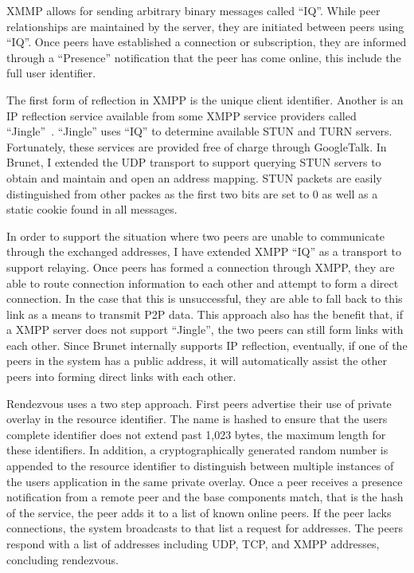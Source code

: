XMMP allows for sending arbitrary binary messages called ``IQ''.  While peer
relationships are maintained by the server, they are initiated between peers
using ``IQ''.  Once peers have established a connection or subscription, they
are informed through a ``Presence'' notification that the peer has come online,
this include the full user identifier.

The first form of reflection in XMPP is the unique client identifier.
Another is an IP reflection service available from some XMPP service providers
called ``Jingle''~\cite{jingle}.  ``Jingle'' uses ``IQ'' to determine available
STUN and TURN servers.  Fortunately, these services are provided free of charge
through GoogleTalk.  In Brunet, I extended the UDP transport to support
querying STUN servers to obtain and maintain and open an address mapping.  STUN
packets are easily distinguished from other packes as the first two bits are
set to 0 as well as a static cookie found in all messages.

In order to support the situation where two peers are unable to communicate
through the exchanged addresses, I have extended XMPP ``IQ'' as a transport to
support relaying.  Once peers has formed a connection through XMPP,
they are able to route connection information to each other and attempt to form
a direct connection.  In the case that this is unsuccessful, they are able to
fall back to this link as a means to transmit P2P data.  This approach also has
the benefit that, if a XMPP server does not support ``Jingle'', the two peers
can still form links with each other.  Since Brunet internally supports IP
reflection, eventually, if one of the peers in the system has a public address,
it will automatically assist the other peers into forming direct links with
each other.

Rendezvous uses a two step approach.  First peers advertise their use
of private overlay in the resource identifier.  The name is hashed to ensure
that the users complete identifier does not extend past 1,023 bytes, the
maximum length for these identifiers.  In addition, a cryptographically
generated random number is appended to the resource identifier to distinguish
between multiple instances of the users application in the same private
overlay.  Once a peer receives a presence notification from a remote peer and
the base components match, that is the hash of the service, the peer adds it to
a list of known online peers.  If the peer lacks connections, the system
broadcasts to that list a request for addresses.  The peers respond with a list
of addresses including UDP, TCP, and XMPP addresses, concluding rendezvous.


